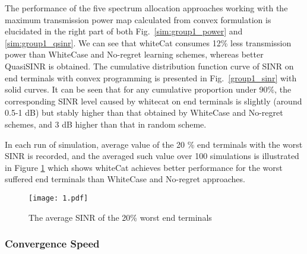 The performance of the five spectrum allocation approaches working with the maximum transmission power map calculated from convex formulation is elucidated in the right part of both Fig.~\ref{sim:group1_power} and \ref{sim:group1_qsinr}. 
We can see that whiteCat consumes 12\% less transmission power than WhiteCase and No-regret learning schemes, whereas better QuasiSINR is obtained. 
The cumulative distribution function curve of SINR on end terminals with convex programming is presented in Fig.~\ref{group1_sinr} with solid curves.
It can be seen that for any cumulative proportion under 90\%, the corresponding SINR level caused by whitecat on end terminals is slightly (around 0.5-1 dB) but stably higher than that obtained by WhiteCase and No-regret schemes, and 3 dB higher than that in random scheme.

In each run of simulation, average value of the 20 \% end terminals with the worst SINR is recorded, and the averaged such value over 100 simulations is illustrated in Figure \ref{group1_worst20sinr} which shows whiteCat achieves better performance for the worst suffered end terminals than WhiteCase and No-regret approaches.

\begin{figure}[h]
  \centering
  \texttt{[image: 1.pdf]}
  \caption{The average SINR of the 20\% worst end terminals}
\label{group1_worst20sinr}
\end{figure}



\subsubsection*{Convergence Speed}

